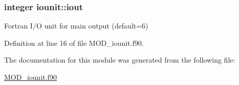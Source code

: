 \hypertarget{classiounit_aa6ee53105beac2f5fedaa08cfccac217}{
\subsubsection[{iout}]{\setlength{\rightskip}{0pt plus 5cm}integer iounit\-::iout}}\label{classiounit_aa6ee53105beac2f5fedaa08cfccac217}


Fortran I/\-O unit for main output (default=6) 



Definition at line 16 of file M\-O\-D\-\_\-iounit.\-f90.



The documentation for this module was generated from the following file\-:\begin{DoxyCompactItemize}
\item 
\hyperlink{MOD__iounit_8f90}{M\-O\-D\-\_\-iounit.\-f90}\end{DoxyCompactItemize}
